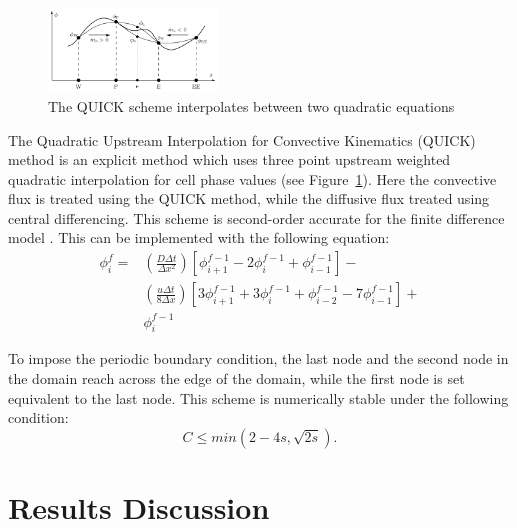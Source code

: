 \documentclass[twocolumn,10pt]{asme2ej}
\begin{document}
\begin{figure}[tbh]
\begin{center}
\includegraphics[width=0.4\textwidth]{figure/QUICK.png}
\caption{The QUICK scheme interpolates between two quadratic equations \cite{analytic_citation}}
\label{QUICK_scheme}
\end{center}
\end{figure}

The Quadratic Upstream Interpolation for Convective Kinematics (QUICK) method is an explicit method which uses three point upstream weighted quadratic interpolation for cell phase values (see Figure~\ref{QUICK_scheme}). Here the convective flux is treated using the QUICK method, while the diffusive flux treated using central differencing. This scheme is second-order accurate for the finite difference model \cite{chen1992advection}. This can be implemented with the following equation:
\begin{equation}
\label{quick_eqn}
\begin{split}
\phi_i ^f = & \left( \frac{D \Delta t}{\Delta x^2} \right) \left[ \phi_{i+1} ^{f-1} - 2 \phi_{i} ^{f-1} + \phi_{i-1} ^{f-1} \right] - \\
            & \left( \frac{u \Delta t}{8 \Delta x} \right) \left[ 3 \phi_{i+1} ^{f-1}  + 3 \phi_{i} ^{f-1}  + \phi_{i-2} ^{f-1} - 7 \phi_{i-1} ^{f-1} \right] + \\
            & \phi_i ^{f-1}
\end{split}
\end{equation}

To impose the periodic boundary condition, the last node and the second node in the domain reach across the edge of the domain, while the first node is set equivalent to the last node. This scheme is numerically stable under the following condition:
\begin{equation}
\label{QUICK_stability}
C \leq min(2 - 4 s, \sqrt{2s}).
\end{equation}

\section{Results Discussion}
\end{document}
